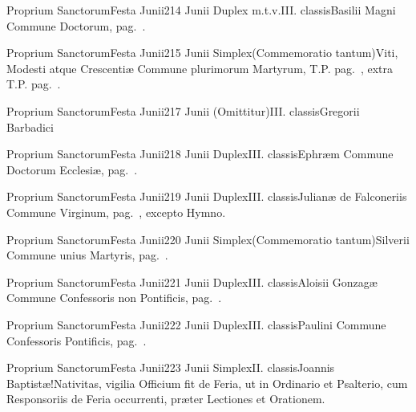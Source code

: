\documentclass[nocturnale-romanum.tex]{subfiles}
\begin{document}
	{Proprium Sanctorum}{Festa Junii}{2}{14 Junii}
	{Duplex m.t.v.}{III. classis}{Basilii Magni}
	{Commune Doctorum, pag.\ \pageref{M-CODO}.}
	{}

	{Proprium Sanctorum}{Festa Junii}{2}{15 Junii}
	{Simplex}{(Commemoratio tantum)}{Viti, Modesti atque Crescentiæ}
	{Commune plurimorum Martyrum, T.P. pag.\ \pageref{M-MRTP}, extra T.P. pag.\ \pageref{M-PMEX}.}
	{}

	{Proprium Sanctorum}{Festa Junii}{2}{17 Junii}
	{(Omittitur)}{III. classis}{Gregorii Barbadici}
	{}
	{}

	{Proprium Sanctorum}{Festa Junii}{2}{18 Junii}
	{Duplex}{III. classis}{Ephræm}
	{Commune Doctorum Ecclesiæ, pag.\ \pageref{M-CODO}.}
	{}

	{Proprium Sanctorum}{Festa Junii}{2}{19 Junii}
	{Duplex}{III. classis}{Julianæ de Falconeriis}
	{Commune Virginum, pag.\ \pageref{M-MU}, excepto Hymno.}
	{}

	{Proprium Sanctorum}{Festa Junii}{2}{20 Junii}
	{Simplex}{(Commemoratio tantum)}{Silverii}
	{Commune unius Martyris, pag.\ \pageref{M-UMEX}.}
	{}

	{Proprium Sanctorum}{Festa Junii}{2}{21 Junii}
	{Duplex}{III. classis}{Aloisii Gonzagæ}
	{Commune Confessoris non Pontificis, pag.\ \pageref{M-CONP}.}
	{}

	{Proprium Sanctorum}{Festa Junii}{2}{22 Junii}
	{Duplex}{III. classis}{Paulini}
	{Commune Confessoris Pontificis, pag.\ \pageref{M-COPO}.}
	{}

	{Proprium Sanctorum}{Festa Junii}{2}{23 Junii}
	{Simplex}{II. classis}{Joannis Baptistæ!Nativitas, vigilia}
	{Officium fit de Feria, ut in Ordinario et Psalterio, cum Responsoriis de Feria occurrenti, præter Lectiones et Orationem.}
	{}
\end{document}
